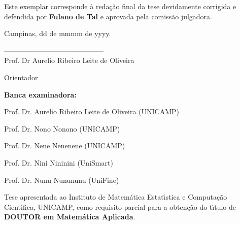 \begin{titlepage}
\thispagestyle{plain}
\begin{center}
\end{center}

\vspace{.5cm}
\hfill
\begin{minipage}{7cm}\sffamily 
Este exemplar corresponde \`a reda\c{c}\~ao final da tese devidamente corrigida
e defendida por {\bfseries Fulano de Tal} e aprovada pela comissão
julgadora.\\
\begin{center}\sffamily 
Campinas, dd de mmmm de yyyy.\\

\vspace*{0.5cm} 

------------------------------------------ \\
Prof. Dr Aurelio Ribeiro Leite de Oliveira

Orientador

\vspace*{.5cm}

\end{center}
\end{minipage}

\vspace*{1cm}
{\sffamily
\textbf{Banca examinadora:}

Prof. Dr.  Aurelio Ribeiro Leite de Oliveira (UNICAMP) \vspace*{1mm}

Prof. Dr. Nono Nonono (UNICAMP)\vspace*{1mm}

Prof. Dr. Nene Nenenene (UNICAMP)\vspace*{1mm}

Prof. Dr. Nini Nininini (UniSmart)\vspace*{1mm}

Prof. Dr. Nunu Nunununu (UniFine)}
\vspace*{2cm}




\hfill
\begin{minipage}{6.5cm}
{ \sffamily Tese apresentada ao Instituto de Matem\'atica Estat\'{\i}stica
e Computa\c{c}\~ao Cient\'{\i}fica, UNICAMP, como requisito parcial para
a obten\c{c}\~ao do t\'{\i}tulo de {\bfseries DOUTOR em Matem\'atica Aplicada}.}
\end{minipage}


\end{titlepage}
